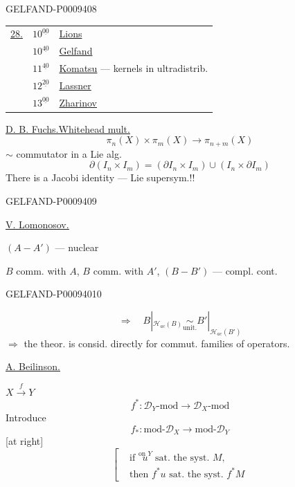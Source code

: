 \begin{GelfandAdjacentEvidence}{GELFAND-P000940}{8}


\begin{tabular}{@{}lll@{}}
\underline{28.} & $10^{\underline{00}}$ & \underline{Lions}\\
 & $10^{\underline{40}}$ & \underline{Gelfand}\\
 & $11^{\underline{40}}$ & \underline{Komatsu} --- kernels in ultradistrib.\\
 & $12^{\underline{20}}$ & \underline{Lassner}\\
 & $13^{\underline{00}}$ & \underline{Zharinov}
\end{tabular}

\underline{D. B. Fuchs.}\qquad\underline{Whitehead mult.}
\[
 \pi_n(X)\times\pi_m(X)\longrightarrow\pi_{n+m}(X)
\]
$\sim$ commutator in a Lie alg.
\[
 \partial(I_n\times I_m)=(\partial I_n\times I_m)\cup(I_n\times\partial I_m)
\]
There is a Jacobi identity --- Lie supersym.!!
\end{GelfandAdjacentEvidence}
\begin{GelfandAdjacentEvidence}{GELFAND-P000940}{9}


\underline{\underline{V. Lomonosov.}}

$(A-A')$ --- nuclear

$B$ comm. with $A$, $B$ comm. with $A'$, $(B-B')$ --- compl. cont.
\end{GelfandAdjacentEvidence}
\begin{GelfandAdjacentEvidence}{GELFAND-P000940}{10}

\[
 \Rightarrow\quad B|_{\mathcal H_{ac}(B)}\underset{\text{unit.}}{\sim}
 B'|_{\mathcal H_{ac}(B')}
\]
$\Rightarrow$ the theor. is consid. directly for commut. families of operators.

\underline{\underline{A. Beilinson.}}

\(X\overset f\longrightarrow Y\)
\begin{equation*}
 f^*:\mathcal D_Y\text{-mod}\longrightarrow\mathcal D_X\text{-mod}
 \tag{1}
\end{equation*}
Introduce
\[
 f_*:\text{mod-}\mathcal D_X\longrightarrow\text{mod-}\mathcal D_Y
\]
[at right]
\[
 \left[\begin{aligned}
 &\text{if }\overset{\text{on $Y$}}{u}\text{ sat. the syst. }M,\\
 &\text{then }f^*u\text{ sat. the syst. }f^*M
 \end{aligned}\right.
\]
\end{GelfandAdjacentEvidence}

